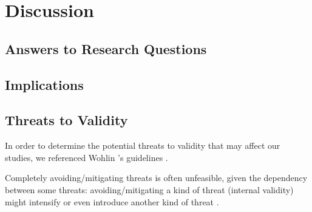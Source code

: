 \section{Discussion}
\subsection{Answers to Research Questions}


\subsection{Implications}


\subsection{Threats to Validity}
In order to determine the potential threats to validity that may affect our studies, we referenced Wohlin \etal 's guidelines \cite{DBLP:books/sp/WohlinRHOR00}.




Completely avoiding/mitigating threats is often unfeasible, given the dependency between some threats: avoiding/mitigating a kind of threat (\ie  internal validity) might intensify or even introduce another kind of threat \cite{DBLP:books/sp/WohlinRHOR00}.

